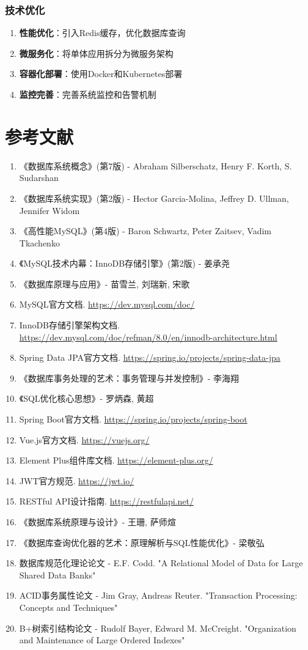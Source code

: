 \documentclass[12pt,a4paper]{article}
\begin{document}
\subsubsection{技术优化}
\begin{enumerate}
    \item \textbf{性能优化}：引入Redis缓存，优化数据库查询
    \item \textbf{微服务化}：将单体应用拆分为微服务架构
    \item \textbf{容器化部署}：使用Docker和Kubernetes部署
    \item \textbf{监控完善}：完善系统监控和告警机制
\end{enumerate}

\section{参考文献}

\begin{enumerate}
    \item 《数据库系统概念》(第7版) - Abraham Silberschatz, Henry F. Korth, S. Sudarshan
    \item 《数据库系统实现》(第2版) - Hector Garcia-Molina, Jeffrey D. Ullman, Jennifer Widom
    \item 《高性能MySQL》(第4版) - Baron Schwartz, Peter Zaitsev, Vadim Tkachenko
    \item 《MySQL技术内幕：InnoDB存储引擎》(第2版) - 姜承尧
    \item 《数据库原理与应用》- 苗雪兰, 刘瑞新, 宋歌
    \item MySQL官方文档. \url{https://dev.mysql.com/doc/}
    \item InnoDB存储引擎架构文档. \url{https://dev.mysql.com/doc/refman/8.0/en/innodb-architecture.html}
    \item Spring Data JPA官方文档. \url{https://spring.io/projects/spring-data-jpa}
    \item 《数据库事务处理的艺术：事务管理与并发控制》- 李海翔
    \item 《SQL优化核心思想》- 罗炳森, 黄超
    \item Spring Boot官方文档. \url{https://spring.io/projects/spring-boot}
    \item Vue.js官方文档. \url{https://vuejs.org/}
    \item Element Plus组件库文档. \url{https://element-plus.org/}
    \item JWT官方规范. \url{https://jwt.io/}
    \item RESTful API设计指南. \url{https://restfulapi.net/}
    \item 《数据库系统原理与设计》- 王珊, 萨师煊
    \item 《数据库查询优化器的艺术：原理解析与SQL性能优化》- 梁敬弘
    \item 数据库规范化理论论文 - E.F. Codd. "A Relational Model of Data for Large Shared Data Banks"
    \item ACID事务属性论文 - Jim Gray, Andreas Reuter. "Transaction Processing: Concepts and Techniques"
    \item B+树索引结构论文 - Rudolf Bayer, Edward M. McCreight. "Organization and Maintenance of Large Ordered Indexes"
\end{enumerate}
\end{document}
